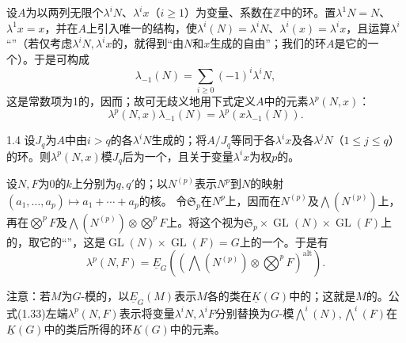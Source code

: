 设$A$为以两列无限个$\lambda^iN$、$\lambda^ix$（$i\geq1$）为变量、系数在$\mathbb Z$中的环。置$\lambda^1N=N$、$\lambda^1x=x$，并在$A$上引入唯一的结构，使$\lambda^i(N)=\lambda^iN$、$\lambda^i(x)=\lambda^ix$，且运算$\lambda^i$“”（若仅考虑$\lambda^iN,\lambda^ix$的，就得到“由$N$和$x$生成的自由”；我们的环$A$是它的一个）。于是可构成
\begin{equation}\lambda_{-1}(N)=\sum_{i\geq0}(-1)^i\lambda^iN,\tag{1.31}\end{equation}
这是常数项为1的，因而；故可无歧义地用下式定义$A$中的元素$\lambda^p(N,x)$：
\begin{equation}\lambda^p(N,x)\lambda_{-1}(N)=\lambda^p(x\lambda_{-1}(N)).\tag{1.32}\end{equation}
\begin{SGAresult}{}{1.4}
设$J_q$为$A$中由$i>q$的各$\lambda^iN$生成的；将$A/J_q$等同于各$\lambda^ix$及各$\lambda^jN$（$1\leq j\leq q$）的环。则$\lambda^p(N,x)$模$J_q$后为一个，且关于变量$\lambda^ix$为权$p$的。

设$N,F$为0的$k$上分别为$q,q'$的；以$N^{(p)}$表示$N^p$到$N$的映射$(a_1,\ldots,a_p)\mapsto a_1+\cdots+a_p$的核。
令$\mathfrak S_p$在$N^p$上，因而在$N^{(p)}$及$\bigwedge(N^{(p)})$上，再在$\bigotimes^pF$及$\bigwedge(N^{(p)})\otimes\bigotimes^pF$上。将这个视为$\mathfrak S_p\times\operatorname{GL}(N)\times\operatorname{GL}(F)$上的，取它的“”，这是$\operatorname{GL}(N)\times\operatorname{GL}(F)=G$上的一个。于是有
\begin{equation}\lambda^p(N,F)=\underline E_G\left(\left(\bigwedge(N^{(p)})\otimes\bigotimes^pF\right)^{\mathrm{alt}}\right).\tag{1.33}\end{equation}
\end{SGAresult}
注意：若$M$为$G$-模的，以$\underline E_G(M)$表示$M$各的类在$\underline K(G)$中的；这就是$M$的。公式(1.33)左端$\lambda^p(N,F)$表示将变量$\lambda^iN,\lambda^iF$分别替换为$G$-模$\bigwedge^i(N),\bigwedge^i(F)$在$\underline K(G)$中的类后所得的环$\underline K(G)$中的元素。

